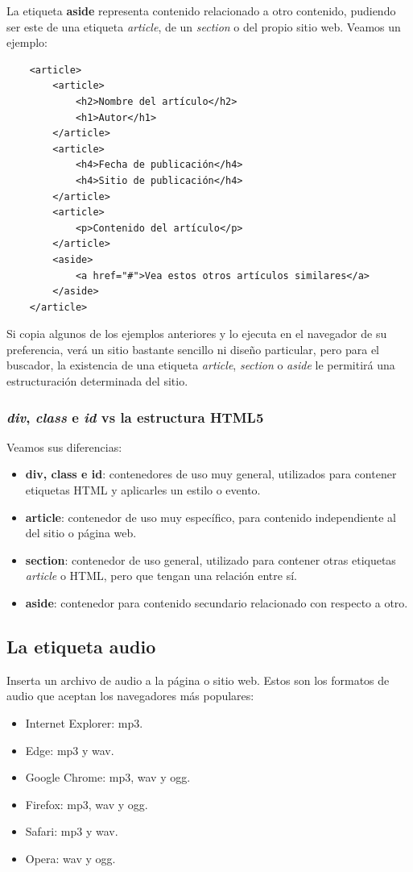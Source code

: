 La etiqueta \textbf{aside} representa contenido relacionado a otro contenido, pudiendo ser este de una etiqueta \textit{article}, de un \textit{section} o del propio sitio web. Veamos un ejemplo:
\begin{lstlisting}
    <article>
        <article>
            <h2>Nombre del artículo</h2>
            <h1>Autor</h1>
        </article>
        <article>
            <h4>Fecha de publicación</h4>
            <h4>Sitio de publicación</h4>
        </article>
        <article>
            <p>Contenido del artículo</p>
        </article>
        <aside>
            <a href="#">Vea estos otros artículos similares</a>
        </aside>
    </article>
\end{lstlisting}

Si copia algunos de los ejemplos anteriores y lo ejecuta en el navegador de su preferencia, verá un sitio bastante sencillo ni diseño particular, pero para el buscador, la existencia de una etiqueta \textit{article}, \textit{section} o \textit{aside} le permitirá una estructuración determinada del sitio.


\subsubsection{\textit{div}, \textit{class} e \textit{id} vs la estructura HTML5}

Veamos sus diferencias:
\begin{itemize}
    \item \textbf{div, class e id}: contenedores de uso muy general, utilizados para contener etiquetas HTML y aplicarles un estilo o evento.
    \item \textbf{article}: contenedor de uso muy específico, para contenido independiente al del sitio o página web.
    \item \textbf{section}: contenedor de uso general, utilizado para contener otras etiquetas \textit{article} o HTML, pero que tengan una relación entre sí.
    \item \textbf{aside}: contenedor para contenido secundario relacionado con respecto a otro.
\end{itemize}


\subsection{La etiqueta audio}

Inserta un archivo de audio a la página o sitio web. Estos son los formatos de audio que aceptan los navegadores más populares:
\begin{itemize}
    \item Internet Explorer: mp3.
    \item Edge: mp3 y wav.
    \item Google Chrome: mp3, wav y ogg.
    \item Firefox: mp3, wav y ogg.
    \item Safari: mp3 y wav.
    \item Opera: wav y ogg.
\end{itemize}

